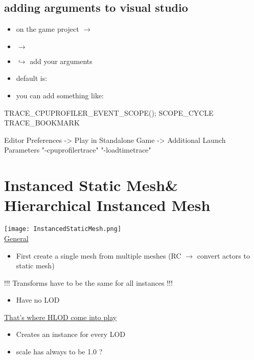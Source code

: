         \subsection{adding arguments to visual studio}
            \begin{itemize}
                \item {} on the game project $\rightarrow$ 
                \item {} $\rightarrow$ 
                \item $\hookrightarrow$ add your arguments
                \item default is: 
                \item you can add something like: \\
            \end{itemize}

TRACE\_CPUPROFILER\_EVENT\_SCOPE();
SCOPE\_CYCLE
TRACE\_BOOKMARK


Editor Preferences -> Play in Standalone Game -> Additional Launch Parameters "-cpuprofilertrace" "-loadtimetrace"


    \section{Instanced Static Mesh\& Hierarchical Instanced Mesh}
        \texttt{[image: InstancedStaticMesh.png]} \\
        \underline{General}
        \begin{itemize}
            \item First create a single mesh from multiple meshes (RC $\rightarrow$ convert actors to static mesh)
        \end{itemize}
        !!! Transforms have to be the same for all instances !!!
        \begin{itemize}
            \item Have no LOD
        \end{itemize}
        \underline{That's where HLOD come into play}
        \begin{itemize}
            \item Creates an instance for every LOD
            \item scale has always to be 1.0 ?
        \end{itemize}

